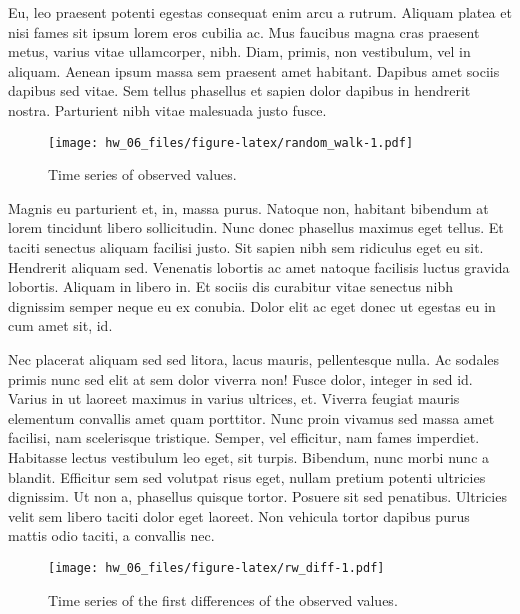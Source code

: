 \documentclass[
  11pt,
]{report}
\begin{document}
Eu, leo praesent potenti egestas consequat enim arcu a rutrum. Aliquam
platea et nisi fames sit ipsum lorem eros cubilia ac. Mus faucibus magna
cras praesent metus, varius vitae ullamcorper, nibh. Diam, primis, non
vestibulum, vel in aliquam. Aenean ipsum massa sem praesent amet
habitant. Dapibus amet sociis dapibus sed vitae. Sem tellus phasellus et
sapien dolor dapibus in hendrerit nostra. Parturient nibh vitae
malesuada justo fusce.

\vspace{0.5in}

\begin{figure}
\centering
\texttt{[image: hw\_06\_files/figure-latex/random\_walk-1.pdf]}
\caption{Time series of observed values.}
\end{figure}

Magnis eu parturient et, in, massa purus. Natoque non, habitant bibendum
at lorem tincidunt libero sollicitudin. Nunc donec phasellus maximus
eget tellus. Et taciti senectus aliquam facilisi justo. Sit sapien nibh
sem ridiculus eget eu sit. Hendrerit aliquam sed. Venenatis lobortis ac
amet natoque facilisis luctus gravida lobortis. Aliquam in libero in. Et
sociis dis curabitur vitae senectus nibh dignissim semper neque eu ex
conubia. Dolor elit ac eget donec ut egestas eu in cum amet sit, id.

Nec placerat aliquam sed sed litora, lacus mauris, pellentesque nulla.
Ac sodales primis nunc sed elit at sem dolor viverra non! Fusce dolor,
integer in sed id. Varius in ut laoreet maximus in varius ultrices, et.
Viverra feugiat mauris elementum convallis amet quam porttitor. Nunc
proin vivamus sed massa amet facilisi, nam scelerisque tristique.
Semper, vel efficitur, nam fames imperdiet. Habitasse lectus vestibulum
leo eget, sit turpis. Bibendum, nunc morbi nunc a blandit. Efficitur sem
sed volutpat risus eget, nullam pretium potenti ultricies dignissim. Ut
non a, phasellus quisque tortor. Posuere sit sed penatibus. Ultricies
velit sem libero taciti dolor eget laoreet. Non vehicula tortor dapibus
purus mattis odio taciti, a convallis nec.

\vspace{0.5in}

\begin{figure}
\centering
\texttt{[image: hw\_06\_files/figure-latex/rw\_diff-1.pdf]}
\caption{Time series of the first differences of the observed values.}
\end{figure}
\end{document}
